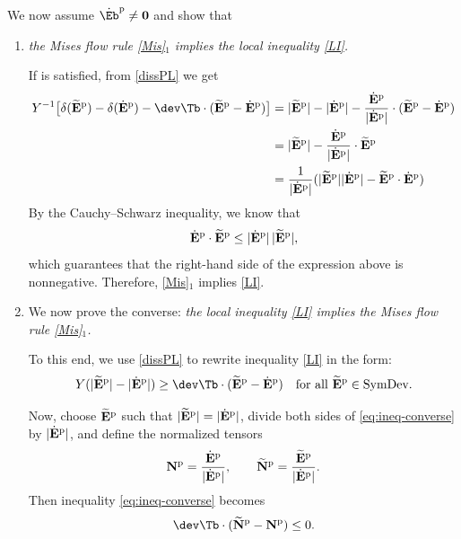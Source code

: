 We now assume $\dot{\Eb}^{\rm p}\neq\mathbf{0}$ and show that
\begin{enumerate}
	\item\textit{ the Mises flow rule  \eqref{Mis}$_1$ implies the local inequality \eqref{LI}.}
	
	If is satisfied, from \eqref{dissPL} we get 
	\begin{equation}
	\begin{aligned}
			Y^{-1} \big[\delta(\widetilde{\mathbf{E}}^{\rm p}) - \delta(\dot{\mathbf{E}}^{\rm p}) - \dev\Tb \cdot (\widetilde{\mathbf{E}}^{\rm p} - \dot{\mathbf{E}}^{\rm p})\big] 
		&= |\widetilde{\mathbf{E}}^{\rm p}| - |\dot{\mathbf{E}}^{\rm p}| - \frac{\dot{\mathbf{E}}^{\rm p}}{|\dot{\mathbf{E}}^{\rm p}|} \cdot (\widetilde{\mathbf{E}}^{\rm p} - \dot{\mathbf{E}}^{\rm p})\\
	&= |\widetilde{\mathbf{E}}^{\rm p}| - \frac{\dot{\mathbf{E}}^{\rm p}}{|\dot{\mathbf{E}}^{\rm p}|} \cdot \widetilde{\mathbf{E}}^{\rm p} \\
	&= \frac{1}{|\dot{\mathbf{E}}^{\rm p}|}( |\widetilde{\mathbf{E}}^{\rm p}| |\dot{\mathbf{E}}^{\rm p}|- \widetilde{\mathbf{E}}^{\rm p}\cdot\dot{\mathbf{E}}^{\rm p})
	\end{aligned}
	\end{equation}
	By the Cauchy–Schwarz inequality, we know that
	\[
	\dot{\mathbf{E}}^{\rm p} \cdot \widetilde{\mathbf{E}}^{\rm p} \leq |\dot{\mathbf{E}}^{\rm p}| \, |\widetilde{\mathbf{E}}^{\rm p}|,
	\]
	which guarantees that the right-hand side of the expression above is nonnegative. Therefore,  \eqref{Mis}$_1$ implies  \eqref{LI}.
\item 	We now prove the converse: \textit{  the local inequality \eqref{LI} implies the Mises flow rule  \eqref{Mis}$_1$.}
 
 To this end, we use \eqref{dissPL} to rewrite inequality \eqref{LI} in the form:
	\begin{equation}\label{eq:ineq-converse}
		Y(|\widetilde{\mathbf{E}}^{\rm p}| - |\dot{\mathbf{E}}^{\rm p}|) \geq \dev\Tb \cdot (\widetilde{\mathbf{E}}^{\rm p} - \dot{\mathbf{E}}^{\rm p}) \quad \text{for all } \widetilde{\mathbf{E}}^{\rm p} \in \text{SymDev}.
	\end{equation}
	
	Now, choose $\widetilde{\mathbf{E}}^{\rm p}$ such that $|\widetilde{\mathbf{E}}^{\rm p}| = |\dot{\mathbf{E}}^{\rm p}|$, divide both sides of \eqref{eq:ineq-converse} by $|\dot{\mathbf{E}}^{\rm p}|$, and define the normalized tensors
	\[
	\mathbf{N}^{\rm p} = \frac{\dot{\mathbf{E}}^{\rm p}}{|\dot{\mathbf{E}}^{\rm p}|}, \qquad \widetilde{\mathbf{N}}^{\rm p} = \frac{\widetilde{\mathbf{E}}^{\rm p}}{|\dot{\mathbf{E}}^{\rm p}|}.
	\]
	Then inequality \eqref{eq:ineq-converse} becomes
	\begin{equation}\label{eq:ineq-converse1} 
		\dev\Tb \cdot (\widetilde{\mathbf{N}}^{\rm p} - \mathbf{N}^{\rm p}) \leq 0. 
	\end{equation}
	

\end{enumerate}
